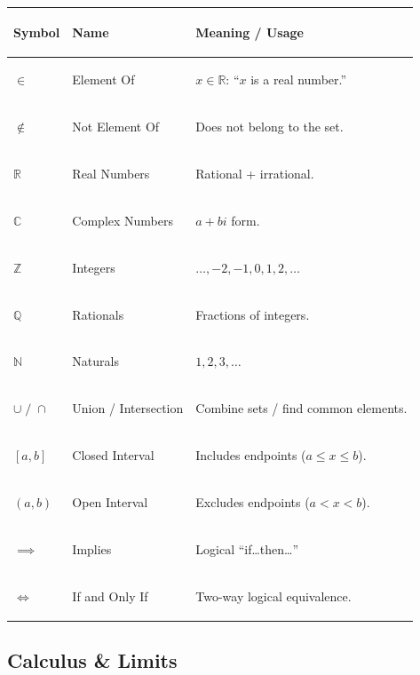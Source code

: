 \documentclass[11pt, letterpaper]{article}
\begin{document}
\noindent
{\renewcommand{\arraystretch}{1.5}
\begin{tabularx}{\textwidth}{>{\centering\arraybackslash}p{1.5cm}
                              >{\bfseries\raggedright\arraybackslash}p{3.5cm}
                              >{\raggedright\arraybackslash}X}
\toprule
\rowcolor{tableheaderpurple}
\textbf{Symbol} & \textbf{Name} & \textbf{Meaning / Usage} \\
\midrule
\rowcolor{rowPu} $\in$ & Element Of & $x \in \mathbb{R}$: ``$x$ is a real number.'' \\
\rowcolor{rowA}  $\notin$ & Not Element Of & Does not belong to the set. \\
\rowcolor{rowPu} $\mathbb{R}$ & Real Numbers & Rational + irrational. \\
\rowcolor{rowA}  $\mathbb{C}$ & Complex Numbers & $a + bi$ form. \\
\rowcolor{rowPu} $\mathbb{Z}$ & Integers & $\ldots, -2, -1, 0, 1, 2, \ldots$ \\
\rowcolor{rowA}  $\mathbb{Q}$ & Rationals & Fractions of integers. \\
\rowcolor{rowPu} $\mathbb{N}$ & Naturals & $1, 2, 3, \ldots$ \\
\rowcolor{rowA}  $\cup \; / \; \cap$ & Union / Intersection & Combine sets / find common elements. \\
\rowcolor{rowPu} $[a, b]$ & Closed Interval & Includes endpoints ($a \leq x \leq b$). \\
\rowcolor{rowA}  $(a, b)$ & Open Interval & Excludes endpoints ($a < x < b$). \\
\rowcolor{rowPu} $\implies$ & Implies & Logical ``if\ldots then\ldots'' \\
\rowcolor{rowA}  $\iff$ & If and Only If & Two-way logical equivalence. \\
\bottomrule
\end{tabularx}}

\subsection*{Calculus \& Limits}
\end{document}
